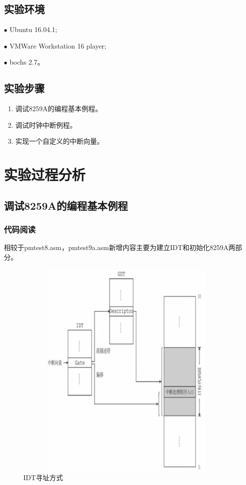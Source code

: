\documentclass[UTF8,12pt]{ctexart}
\begin{document}
    \subsection{实验环境}
    $\bullet$ Ubuntu 16.04.1;
    
    $\bullet$ VMWare Workstation 16 player;
    
    $\bullet$ bochs 2.7。
    
    \subsection{实验步骤}
    \begin{enumerate}
        \item 调试8259A的编程基本例程。
        \item 调试时钟中断例程。
        \item 实现一个自定义的中断向量。
    \end{enumerate}
    
    
    \section{实验过程分析}
    
    \subsection{调试8259A的编程基本例程}
    \subsubsection{代码阅读}
    相较于pmtest8.asm，pmtest9a.asm新增内容主要为建立IDT和初始化8259A两部分。
    \begin{figure}[H]
        \centering
        \includegraphics[width=12cm,height=11cm]{images/IDT.png}
        \caption{IDT寻址方式}
        \label{IDT寻址方式}
    \end{figure}
    
\end{document}
